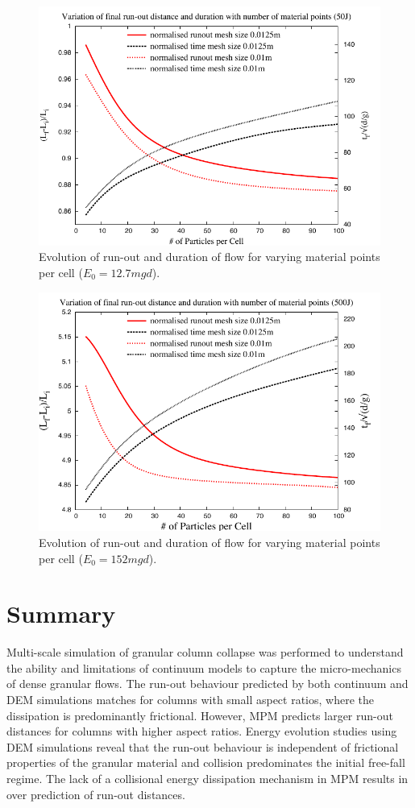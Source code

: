 \begin{figure}[tbhp]
\centering
\includegraphics[width=\textwidth]{50}
\caption{Evolution of run-out and duration of flow  for varying material points per cell ($E_0=12.7mgd$).}
\label{fig:50}
\end{figure}

\begin{figure}[tbhp]
\centering
\includegraphics[width=\textwidth]{500}
\caption{Evolution of run-out and duration of flow  for varying material points per cell ($E_0=152mgd$).}
\label{fig:500}
\end{figure}

\section{Summary}
Multi-scale simulation of granular column collapse was performed to understand 
the ability and limitations of continuum models to capture the micro-mechanics 
of dense granular flows. The run-out behaviour predicted by both continuum and 
DEM simulations matches for columns with small aspect ratios, where the 
dissipation is predominantly frictional. However, MPM predicts larger run-out 
distances for columns with higher aspect ratios. Energy evolution studies using 
DEM simulations reveal that the run-out behaviour is independent of frictional 
properties of the granular material and collision predominates the initial 
free-fall regime. The lack of a collisional energy dissipation mechanism in MPM 
results in over prediction of run-out distances. 